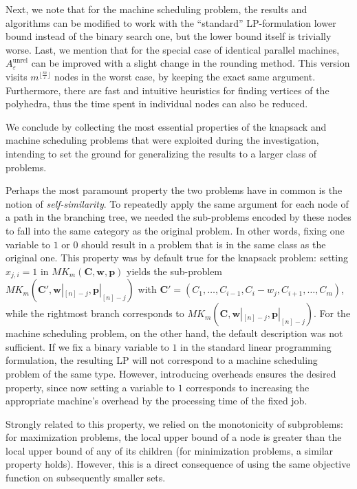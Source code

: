 \documentclass[moor,sglanonrev]{informs4}
\theoremstyle{plain}
\begin{document}
Next, we note that for the machine scheduling problem, the results and algorithms can be modified to work with the ``standard'' LP-formulation lower bound instead of the binary search one, but the lower bound itself is trivially worse. Last, we mention that for the special case of identical parallel machines, $A_{\varepsilon}^{\text{unrel}}$ can be improved with a slight change in the rounding method. This version visits $m^{\lfloor \frac{m}{\varepsilon}\rfloor}$ nodes in the worst case, by keeping the exact same argument. Furthermore, there are fast and intuitive heuristics for finding vertices of the polyhedra, thus the time spent in individual nodes can also be reduced.

We conclude by collecting the most essential properties of the knapsack and machine scheduling problems that were exploited during the investigation, intending to set the ground for generalizing the results to a larger class of problems. 

Perhaps the most paramount property the two problems have in common is the notion of \emph{self-similarity}. To repeatedly apply the same argument for each node of a path in the branching tree, we needed the sub-problems encoded by these nodes to fall into the same category as the original problem. In other words, fixing one variable to $1$ or $0$ should result in a problem that is in the same class as the original one. This property was by default true for the knapsack problem: setting $x_{j, i} = 1$ in $MK_m(\bm{C}, \bm{w}, \bm{p})$ yields the sub-problem $MK_m(\bm{C'}, \bm{w}|_{[n]-j}, \bm{p}|_{[n]-j})$ with $\bm{C'} = (C_1, \ldots, C_{i-1}, C_i - w_j, C_{i+1}, \ldots, C_m)$, while the rightmost branch corresponds to $MK_m(\bm{C}, \bm{w}|_{[n]-j}, \bm{p}|_{[n]-j})$. For the machine scheduling problem, on the other hand, the default description was not sufficient. If we fix a binary variable to $1$ in the standard linear programming formulation, the resulting LP will not correspond to a machine scheduling problem of the same type. However, introducing overheads ensures the desired property, since now setting a variable to $1$ corresponds to increasing the appropriate machine's overhead by the processing time of the fixed job.

Strongly related to this property, we relied on the monotonicity of subproblems: for maximization problems, the local upper bound of a node is greater than the local upper bound of any of its children (for minimization problems, a similar property holds). However, this is a direct consequence of using the same objective function on subsequently smaller sets.
\end{document}
